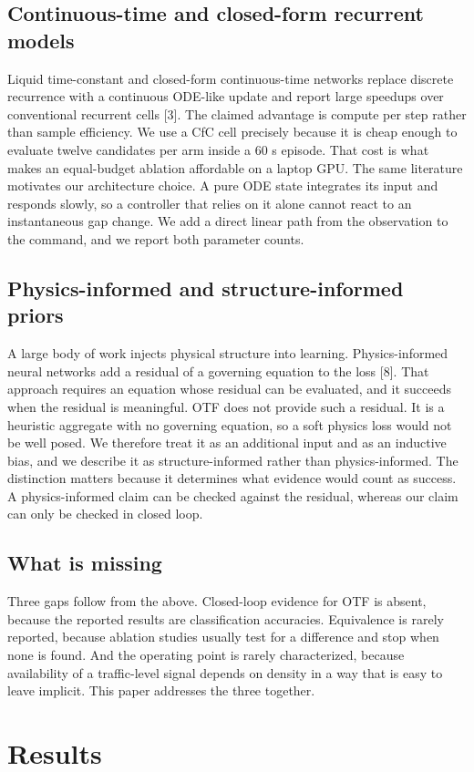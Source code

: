 \documentclass[journal]{IEEEtran}
\begin{document}
\subsection{Continuous-time and closed-form recurrent models}
Liquid time-constant and closed-form continuous-time networks replace discrete recurrence with a
continuous ODE-like update and report large speedups over conventional recurrent cells [3]. The claimed advantage is compute per step rather than sample efficiency. We use a CfC cell
precisely because it is cheap enough to evaluate twelve candidates per arm inside a 60 s episode. That
cost is what makes an equal-budget ablation affordable on a laptop GPU.
The same literature motivates our architecture choice. A pure ODE state integrates its input and
responds slowly, so a controller that relies on it alone cannot react to an instantaneous gap change.
We add a direct linear path from the observation to the command, and we report both parameter counts.
\subsection{Physics-informed and structure-informed priors}
A large body of work injects physical structure into learning. Physics-informed neural networks add a
residual of a governing equation to the loss [8]. That approach requires an
equation whose residual can be evaluated, and it succeeds when the residual is meaningful.
OTF does not provide such a residual. It is a heuristic aggregate with no governing equation, so a
soft physics loss would not be well posed. We therefore treat it as an additional input and as an
inductive bias, and we describe it as structure-informed rather than physics-informed. The distinction
matters because it determines what evidence would count as success. A physics-informed claim can be
checked against the residual, whereas our claim can only be checked in closed loop.
\subsection{What is missing}
Three gaps follow from the above. Closed-loop evidence for OTF is absent, because the reported results
are classification accuracies. Equivalence is rarely reported, because ablation studies usually test
for a difference and stop when none is found. And the operating point is rarely characterized, because
availability of a traffic-level signal depends on density in a way that is easy to leave implicit. This
paper addresses the three together.
\section*{Results}
\end{document}
